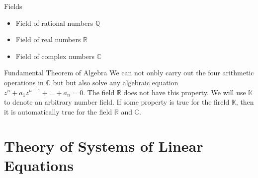 \documentclass[11pt]{article} %
\newenvironment{example}[1][Example]{\begin{trivlist}
\item[\hskip \labelsep {\bfseries #1}]}{\end{trivlist}}
\newenvironment{remark}[1][Remark]{\begin{trivlist}
\item[\hskip \labelsep {\bfseries #1}]}{\end{trivlist}}
\begin{document}
\begin{example}
	Fields
	\begin{itemize} 
		\item Field of rational numbers $\mathbb{Q}$ 
		\item Field of real numbers $\mathbb{R}$
		\item Field of complex numbers $\mathbb{C}$
	\end{itemize} 
\end{example}

\begin{remark}
	Fundamental Theorem of Algebra We can not onbly carry out the four arithmetic operations in $\mathbb{C}$ but but also solve any algebraic equation $z^n + {a_1}z^{n - 1} + \ldots + a_n = 0$. The field $\mathbb{R}$ does not have this property. We will use $\mathbb{K}$ to denote an arbitrary number field. If some property is true for the fireld $\mathbb{K}$, then it is automatically true for the field $\mathbb{R}$ and $\mathbb{C}$.
\end{remark}

\section{Theory of Systems of Linear Equations}
\end{document}
